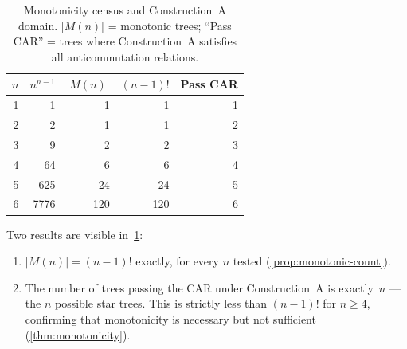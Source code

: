 \begin{table}[t]
\centering
\caption{Monotonicity census and Construction~A domain.  $|M(n)|$ =
  monotonic trees; ``Pass CAR'' = trees where Construction~A satisfies
  all anticommutation relations.}
\label{tab:monotonicity}
\begin{tabular}{@{}rrrrr@{}}
\toprule
$n$ & $n^{n-1}$ & $|M(n)|$ & $(n{-}1)!$ & Pass CAR \\
\midrule
1 &       1 &     1 &     1 &  1 \\
2 &       2 &     1 &     1 &  2 \\
3 &       9 &     2 &     2 &  3 \\
4 &      64 &     6 &     6 &  4 \\
5 &     625 &    24 &    24 &  5 \\
6 &    7776 &   120 &   120 &  6 \\
\bottomrule
\end{tabular}
\end{table}

Two results are visible in~\cref{tab:monotonicity}:
\begin{enumerate}
  \item $|M(n)| = (n{-}1)!$ exactly, for every $n$ tested
    (\cref{prop:monotonic-count}).
  \item The number of trees passing the CAR under Construction~A
    is exactly~$n$ --- the $n$ possible star trees.  This is strictly
    less than $(n{-}1)!$ for $n \ge 4$, confirming that monotonicity
    is necessary but not sufficient (\cref{thm:monotonicity}).
\end{enumerate}
